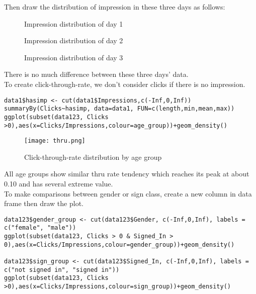 \documentclass{article}
\begin{document}
Then draw the distribution of impression in these three days as follows:
\begin{figure}[H]
  \centering
  \hspace{1cm}
  \caption{Impression distribution of day 1}
\end{figure}
\begin{figure}[H]
  \centering
  \hspace{1cm}
  \caption{Impression distribution of day 2}
\end{figure}
\begin{figure}[H]
  \centering
  \hspace{1cm}
  \caption{Impression distribution of day 3}
\end{figure}
There is no much difference between these three days' data. \\
To create click-through-rate, we don't consider clicks if there is no impression. \\
\begin{verbatim}
data1$hasimp <- cut(data1$Impressions,c(-Inf,0,Inf))
summaryBy(Clicks~hasimp, data=data1, FUN=c(length,min,mean,max))
ggplot(subset(data123, Clicks >0),aes(x=Clicks/Impressions,colour=age_group))+geom_density()
\end{verbatim}
\begin{figure}[H] 
\begin{center} 
\texttt{[image: thru.png]}  
\caption{Click-through-rate distribution by age group} 
\end{center} 
\end{figure}
All age groups show similar thru rate tendency which reaches its peak at about 0.10 and has several extreme value. \\
To make comparisons between gender or sign class, create a new column in data frame then draw the plot.  \\
\begin{verbatim}
data123$gender_group <- cut(data123$Gender, c(-Inf,0,Inf), labels = c("female", "male"))
ggplot(subset(data123, Clicks > 0 & Signed_In > 0),aes(x=Clicks/Impressions,colour=gender_group))+geom_density()

data123$sign_group <- cut(data123$Signed_In, c(-Inf,0,Inf), labels = c("not signed in", "signed in"))
ggplot(subset(data123, Clicks >0),aes(x=Clicks/Impressions,colour=sign_group))+geom_density()
\end{verbatim}
\end{document}
